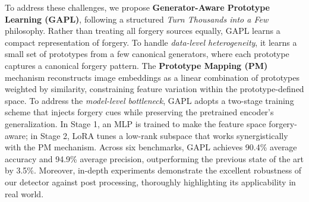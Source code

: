 To address these challenges, we propose \textbf{Generator-Aware Prototype Learning (GAPL)}, following a structured \textit{Turn Thousands into a Few} philosophy. Rather than treating all forgery sources equally, GAPL learns a compact representation of forgery. To handle \textit{data-level heterogeneity}, it learns a small set of prototypes from a few canonical generators, where each prototype captures a canonical forgery pattern. The \textbf{Prototype Mapping (PM)} mechanism reconstructs image embeddings as a linear combination of prototypes weighted by similarity, constraining feature variation within the prototype-defined space. To address the \textit{model-level bottleneck}, GAPL adopts a two-stage training scheme that injects forgery cues while preserving the pretrained encoder’s generalization. In Stage 1, an MLP is trained to make the feature space forgery-aware; in Stage 2, LoRA \cite{hu2022lora} tunes a low-rank subspace that works synergistically with the PM mechanism. Across six benchmarks, GAPL achieves 90.4\% average accuracy and 94.9\% average precision, outperforming the previous state of the art by 3.5\%. Moreover, in-depth experiments demonstrate the excellent robustness of our detector against post processing, thoroughly highlighting its applicability in real world.

